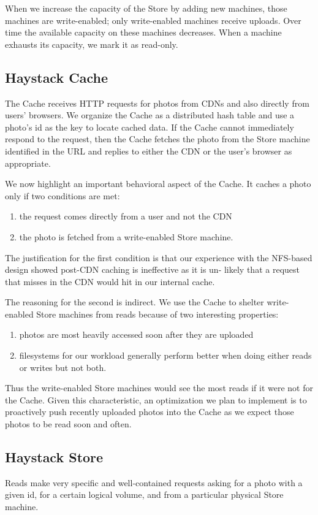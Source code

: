 \documentclass[11pt]{article}
\begin{document}
When we increase the capacity of the Store by adding new machines, those machines are write-enabled;
only write-enabled machines receive uploads. Over time the available capacity on these machines
decreases. When a machine exhausts its capacity, we mark it as read-only.
\subsection{Haystack Cache}
\label{sec:org2795662}
The Cache receives HTTP requests for photos from CDNs and also directly from users’ browsers. We
organize the Cache as a distributed hash table and use a photo’s id as the key to locate cached data.
If the Cache cannot immediately respond to the request, then the Cache fetches the photo from the
Store machine identified in the URL and replies to either the CDN or the user’s browser as
appropriate.

We now highlight an important behavioral aspect of the Cache. It caches a photo only if two conditions
are met:
\begin{enumerate}
\item the request comes directly from a user and not the CDN
\item the photo is fetched from a write-enabled Store machine.
\end{enumerate}

The justification for the first condition is that our experience with the NFS-based design showed
post-CDN caching is ineffective as it is un- likely that a request that misses in the CDN would hit in
our internal cache.

The reasoning for the second is indirect. We use the Cache to shelter write-enabled Store machines
from reads because of two interesting properties:
\begin{enumerate}
\item photos are most heavily accessed soon after they are uploaded
\item filesystems for our workload generally perform better when doing either reads or writes but not
both.
\end{enumerate}

Thus the write-enabled Store machines would see the most reads if it were not for the Cache. Given
this characteristic, an optimization we plan to implement is to proactively push recently uploaded
photos into the Cache as we expect those photos to be read soon and often.
\subsection{Haystack Store}
\label{sec:orgfe9dd5a}
Reads make very specific and well-contained requests asking for a photo with a given id, for a certain
logical volume, and from a particular physical Store machine.
\end{document}
